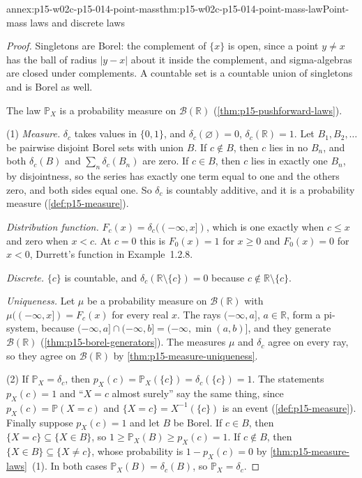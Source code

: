 \begin{annexitem}{annex:p15-w02c-p15-014-point-mass}{thm:p15-w02c-p15-014-point-mass-law}{Point-mass laws and discrete laws}
\begin{proof}
Singletons are Borel: the complement of \(\{x\}\) is open, since a
point \(y\neq x\) has the ball of radius \(|y-x|\) about it inside the
complement, and sigma-algebras are closed under complements. A countable
set is a countable union of singletons and is Borel as well.

The law \(\mathbb P_X\) is a probability measure on
\(\mathcal B(\mathbb R)\) (\cref{thm:p15-pushforward-laws}).

(1) \emph{Measure.} \(\delta_c\) takes values in \(\{0,1\}\), and
\(\delta_c(\varnothing)=0\), \(\delta_c(\mathbb R)=1\). Let
\(B_1,B_2,\ldots\) be pairwise disjoint Borel sets with union \(B\). If
\(c\notin B\), then \(c\) lies in no \(B_n\), and both
\(\delta_c(B)\) and \(\sum_n\delta_c(B_n)\) are zero. If \(c\in B\),
then \(c\) lies in exactly one \(B_n\), by disjointness, so the series
has exactly one term equal to one and the others zero, and both sides
equal one. So \(\delta_c\) is countably additive, and it is a
probability measure (\cref{def:p15-measure}).

\emph{Distribution function.} \(F_c(x)=\delta_c((-\infty,x])\), which
is one exactly when \(c\leq x\) and zero when \(x<c\). At \(c=0\) this
is \(F_0(x)=1\) for \(x\geq0\) and \(F_0(x)=0\) for \(x<0\), Durrett's
function in Example~1.2.8.

\emph{Discrete.} \(\{c\}\) is countable, and
\(\delta_c(\mathbb R\setminus\{c\})=0\) because \(c\notin\mathbb
R\setminus\{c\}\).

\emph{Uniqueness.} Let \(\mu\) be a probability measure on
\(\mathcal B(\mathbb R)\) with \(\mu((-\infty,x])=F_c(x)\) for every
real \(x\). The rays \((-\infty,a]\), \(a\in\mathbb R\), form a
pi-system, because
\((-\infty,a]\cap(-\infty,b]=(-\infty,\min(a,b)]\), and they generate
\(\mathcal B(\mathbb R)\) (\cref{thm:p15-borel-generators}). The
measures \(\mu\) and \(\delta_c\) agree on every ray, so they agree on
\(\mathcal B(\mathbb R)\) by \cref{thm:p15-measure-uniqueness}.

(2) If \(\mathbb P_X=\delta_c\), then
\(p_X(c)=\mathbb P_X(\{c\})=\delta_c(\{c\})=1\). The statements
\(p_X(c)=1\) and ``\(X=c\) almost surely'' say the same thing, since
\(p_X(c)=\mathbb P(X=c)\) and \(\{X=c\}=X^{-1}(\{c\})\) is an event
(\cref{def:p15-measure}). Finally suppose \(p_X(c)=1\) and let \(B\) be
Borel. If \(c\in B\), then \(\{X=c\}\subseteq\{X\in B\}\), so
\(1\geq\mathbb P_X(B)\geq p_X(c)=1\). If \(c\notin B\), then
\(\{X\in B\}\subseteq\{X\neq c\}\), whose probability is
\(1-p_X(c)=0\) by \cref{thm:p15-measure-laws}~(1). In both cases \(\mathbb P_X(B)=\delta_c(B)\), so
\(\mathbb P_X=\delta_c\).


\end{proof}
\end{annexitem}
